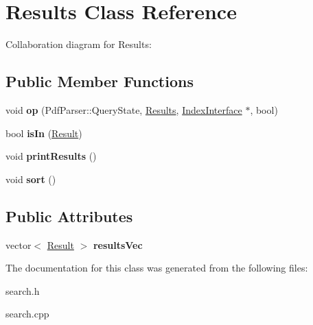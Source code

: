 \hypertarget{classResults}{}\section{Results Class Reference}
\label{classResults}


Collaboration diagram for Results\+:
\subsection*{Public Member Functions}
\begin{DoxyCompactItemize}
\item 
void {\bfseries op} (Pdf\+Parser\+::\+Query\+State, \hyperlink{classResults}{Results}, \hyperlink{classIndexInterface}{Index\+Interface} $\ast$, bool)\hypertarget{classResults_a64f2a50f0576ca056e1429e9680bfd6a}{}\label{classResults_a64f2a50f0576ca056e1429e9680bfd6a}

\item 
bool {\bfseries is\+In} (\hyperlink{classResult}{Result})\hypertarget{classResults_a8ff5626825c1959982e5c820dfc6a9d2}{}\label{classResults_a8ff5626825c1959982e5c820dfc6a9d2}

\item 
void {\bfseries print\+Results} ()\hypertarget{classResults_aaf23e7b660122ebecfc1fef138f5753a}{}\label{classResults_aaf23e7b660122ebecfc1fef138f5753a}

\item 
void {\bfseries sort} ()\hypertarget{classResults_a2a26f1e39e8e480f3cf6305bb769ff9d}{}\label{classResults_a2a26f1e39e8e480f3cf6305bb769ff9d}

\end{DoxyCompactItemize}
\subsection*{Public Attributes}
\begin{DoxyCompactItemize}
\item 
vector$<$ \hyperlink{classResult}{Result} $>$ {\bfseries results\+Vec}\hypertarget{classResults_a8e8b7a78148ed464ac33942f6b9bad38}{}\label{classResults_a8e8b7a78148ed464ac33942f6b9bad38}

\end{DoxyCompactItemize}


The documentation for this class was generated from the following files\+:\begin{DoxyCompactItemize}
\item 
search.\+h\item 
search.\+cpp\end{DoxyCompactItemize}
